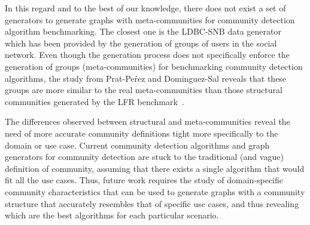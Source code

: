 In this regard and to the best of our knowledge, there does not exist a set of generators to generate graphs with meta-communities for community detection algorithm benchmarking. The closest one is the LDBC-SNB data generator~\cite{Erling:2015:LSN:2723372.2742786} which has been provided by the generation of groups of users in the social network. Even though the generation process does not specifically enforce the generation of groups (meta-communities) for benchmarking community detection algorithms, the study from Prat-Pe\'rez and Dominguez-Sal reveals that these groups are more similar to the real meta-communities than those structural communities generated by the LFR benchmark~\cite{Prat-Perez:2014:CSS:2621934.2621942}.

The differences observed between structural and meta-communities reveal the need of more accurate community definitions tight more specifically to the domain or use case. Current community detection algorithms and graph generators for community detection are stuck to the traditional (and vague) definition of community, assuming that there exists a single algorithm that would fit all the use cases. Thus, future work requires the study of domain-specific community characteristics that can be used to generate graphs with a community structure that accurately resembles that of specific use cases, and thus revealing which are the best algorithms for each particular scenario.

